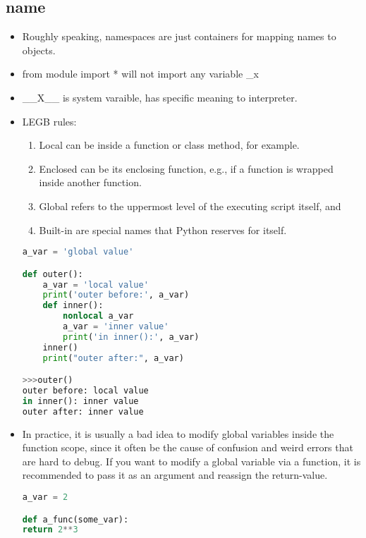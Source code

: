 \documentclass[a4paper,12pt,twoside]{book}
\begin{document}
\subsection{name}
\begin{itemize}
	\item Roughly speaking, namespaces are just containers for mapping names to objects. 
	
	\item from module import * will not import  any variable \_x

	\item \_\_X\_\_ is system varaible, has specific meaning to interpreter. 

	\item LEGB rules:
	\begin{enumerate}
		\item 	Local can be inside a function or class method, for example.
		
		\item Enclosed can be its enclosing function, e.g., if a function is wrapped inside another function.
		
		\item Global refers to the uppermost level of the executing script itself, and
		
		\item Built-in are special names that Python reserves for itself.
	\end{enumerate}

\begin{lstlisting}[frame=single, language=Python]
a_var = 'global value'

def outer():
	a_var = 'local value'
	print('outer before:', a_var)
	def inner():
		nonlocal a_var
		a_var = 'inner value'
		print('in inner():', a_var)
	inner()
	print("outer after:", a_var)

>>>outer()
outer before: local value
in inner(): inner value
outer after: inner value
	\end{lstlisting}  
	
	\item In practice, it is usually a bad idea to modify global variables inside the function scope, since it often be the cause of confusion and weird errors that are hard to debug.
	If you want to modify a global variable via a function, it is recommended to pass it as an argument and reassign the return-value.
\begin{lstlisting}[frame=single, language=Python]
a_var = 2

def a_func(some_var):
return 2**3


\end{lstlisting}
\end{itemize}
\end{document}
